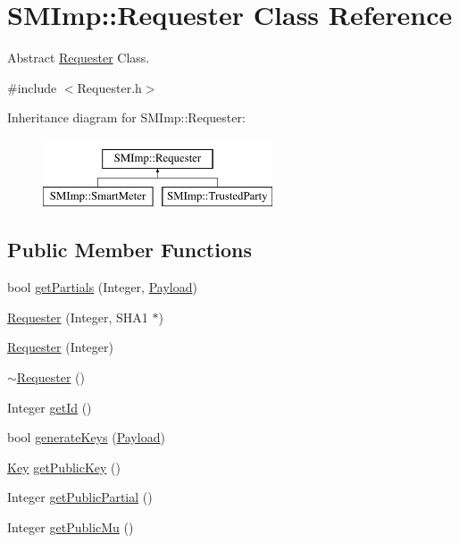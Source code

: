 \hypertarget{classSMImp_1_1Requester}{}\section{S\+M\+Imp\+:\+:Requester Class Reference}
\label{classSMImp_1_1Requester}


Abstract \hyperlink{classSMImp_1_1Requester}{Requester} Class.  




{\ttfamily \#include $<$Requester.\+h$>$}

Inheritance diagram for S\+M\+Imp\+:\+:Requester\+:\begin{figure}[H]
\begin{center}
\leavevmode
\includegraphics[height=2.000000cm]{classSMImp_1_1Requester}
\end{center}
\end{figure}
\subsection*{Public Member Functions}
\begin{DoxyCompactItemize}
\item 
bool \hyperlink{classSMImp_1_1Requester_aeba5d66cc755813cf8a7ae07c6800afe}{get\+Partials} (Integer, \hyperlink{structSMImp_1_1Payload}{Payload})
\item 
\hyperlink{classSMImp_1_1Requester_a4744d2fc0acb30a3ddfeac5d5d260e5e}{Requester} (Integer, S\+H\+A1 $\ast$)
\item 
\hyperlink{classSMImp_1_1Requester_afa51c29da77f8040ab34da85604e043d}{Requester} (Integer)
\item 
\hyperlink{classSMImp_1_1Requester_a2ba23cedf593171733290231dd4147c9}{$\sim$\+Requester} ()
\item 
Integer \hyperlink{classSMImp_1_1Requester_aab47f28abff18bff606b09a6f08b777f}{get\+Id} ()
\item 
bool \hyperlink{classSMImp_1_1Requester_ab284de7cb9eb32ae06d4f4359023d82b}{generate\+Keys} (\hyperlink{structSMImp_1_1Payload}{Payload})
\item 
\hyperlink{structSMImp_1_1Key}{Key} \hyperlink{classSMImp_1_1Requester_a02db2b7bd3da670640cc382da7100653}{get\+Public\+Key} ()
\item 
Integer \hyperlink{classSMImp_1_1Requester_a1aaa8a7e923b59ddf07b97d0f68a7fba}{get\+Public\+Partial} ()
\item 
Integer \hyperlink{classSMImp_1_1Requester_ae2056dddfa3eebd8a84ed407038ec064}{get\+Public\+Mu} ()
\end{DoxyCompactItemize}
